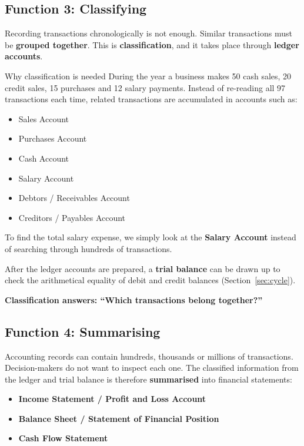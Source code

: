 \documentclass[11pt,a4paper]{article}
\begin{document}
\subsection{Function 3: Classifying}

Recording transactions chronologically is not enough. Similar transactions must be
\textbf{grouped together}. This is \textbf{classification}, and it takes place through
\textbf{ledger accounts}.

\begin{exbox}{Why classification is needed}
During the year a business makes 50 cash sales, 20 credit sales, 15 purchases and 12 salary
payments. Instead of re-reading all 97 transactions each time, related transactions are
accumulated in accounts such as:
\begin{itemize}
  \item Sales Account
  \item Purchases Account
  \item Cash Account
  \item Salary Account
  \item Debtors / Receivables Account
  \item Creditors / Payables Account
\end{itemize}
To find the total salary expense, we simply look at the \textbf{Salary Account} instead of
searching through hundreds of transactions.
\end{exbox}

After the ledger accounts are prepared, a \textbf{trial balance} can be drawn up to check the
arithmetical equality of debit and credit balances (Section~\ref{sec:cycle}).

\begin{keybox}
\textbf{Classification answers: ``Which transactions belong together?''}
\end{keybox}

\subsection{Function 4: Summarising}

Accounting records can contain hundreds, thousands or millions of transactions. Decision-makers
do not want to inspect each one. The classified information from the ledger and trial balance
is therefore \textbf{summarised} into financial statements:

\begin{itemize}
  \item \textbf{Income Statement / Profit and Loss Account}
  \item \textbf{Balance Sheet / Statement of Financial Position}
  \item \textbf{Cash Flow Statement}
\end{itemize}
\end{document}
